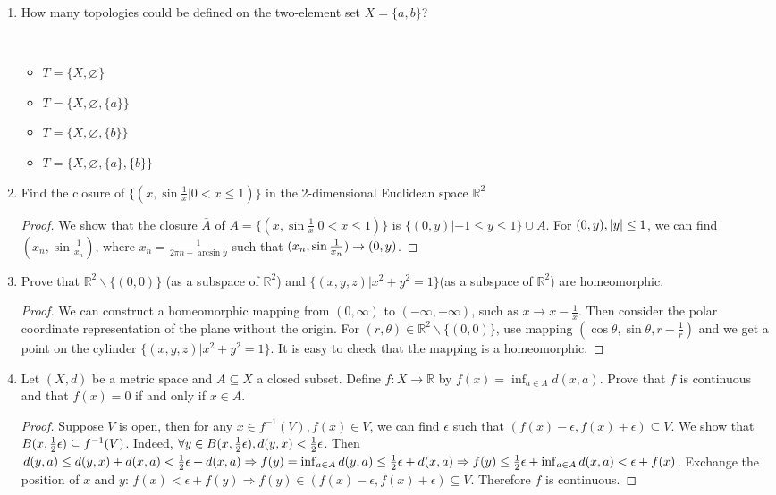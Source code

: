 \documentclass{article}
\DeclarePairedDelimiter\abs{\lvert}{\rvert}
\def\emptyset{\varnothing}
\begin{document}
\courseheader
{}
\begin{enumerate}
\item How many topologies could be defined on the two-element set $X=\{a,b\}$?
\begin{solution}
\quad\\
\begin{itemize}
\item $T=\{X,\emptyset\}$
\item $T=\{X,\emptyset,\{a\}\}$
\item $T=\{X,\emptyset,\{b\}\}$
\item $T=\{X,\emptyset,\{a\},\{b\}\}$
\end{itemize}
\end{solution}
\item Find the closure of $\{(x,\sin \frac{1}{x}| 0<x\leq 1)\}$ in the 2-dimensional Euclidean space $\mathbb{R}^2$
\begin{proof}%
We show that the closure $\bar{A}$ of $A=\{(x,\sin \frac{1}{x}| 0<x\leq 1)\}$ is $ \{(0,y)|-1\leq y\leq 1\}\cup A$.
For $(0,y),\abs{y}\leq 1$, we can find $(x_n,\sin\frac{1}{x_n})$, where $x_n=\frac{1}{2\pi n +\arcsin y}$ such that $(x_n,\sin {1\over x_n}) \to (0,y)$.
\end{proof}

\item Prove that $\mathbb{R}^2\backslash\{(0,0)\}$ (as a subspace of $\mathbb{R}^2$) and $\{(x,y,z)|x^2+y^2=1\}$(as a subspace of $\mathbb{R}^2$) are homeomorphic.
\begin{proof}
We can construct a homeomorphic mapping from  $(0,\infty)$ to $(-\infty,+\infty)$, such as $x\to x-\frac{1}{x}$. Then consider the polar coordinate representation of the plane without the origin. For $(r,\theta)  \in \mathbb{R}^2\backslash\{(0,0)\}$, use mapping $(\cos\theta,\sin\theta,r-\frac{1}{r})$ and we get a point on the cylinder $\{(x,y,z)|x^2+y^2=1\}$. It is easy to check that the mapping is a homeomorphic.
\end{proof}
\item Let $(X,d)$ be a metric space and $A\subseteq X$ a closed subset. Define $f:  X\to \mathbb{R}$ by $f(x) = \inf_{a\in A} d(x,a)$. Prove that $f$ is continuous and that $f(x)=0$ if and only if $x\in A$.
\begin{proof}
Suppose $V$ is open, then for any $x\in f^{-1}(V),f(x)\in V$, we can find $\epsilon$ such that $(f(x)-\epsilon,f(x)+\epsilon)\subseteq V$.
We show that $B(x,{1\over 2}\epsilon) \subseteq f^{-1}(V)$. Indeed, $\forall y \in B(x,{1\over 2}\epsilon),d(y,x)<{1 \over 2}\epsilon$. Then $d(y,a)\leq d(y,x)+d(x,a)<{1 \over 2}\epsilon+d(x,a) \Rightarrow f(y)=\inf_{a\in A}d(y,a)\leq {1\over 2}\epsilon+d(x,a) \Rightarrow f(y)\leq {1\over 2}\epsilon+\inf_{a\in A}d(x,a)<\epsilon+f(x)$. Exchange the position of $x$ and $y$: $f(x)< \epsilon+f(y) \Rightarrow f(y)\in (f(x)-\epsilon,f(x)+\epsilon)\subseteq V$.
Therefore $f$ is continuous.


\end{proof}
\end{enumerate}
\end{document}

